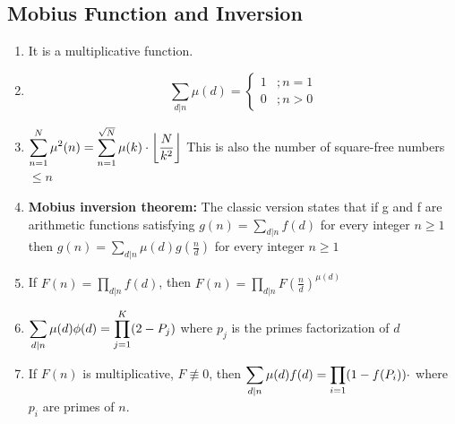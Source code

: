 \subsection{Mobius Function and Inversion}
\begin{enumerate}[resume]
    \item It is a multiplicative function.
    \item \[\sum_{d|n}\mu(d) =
              \begin{cases}
                  1 & ; n=1   \\
                  0 & ; n > 0
              \end{cases}\]
    \item $\displaystyle \displaystyle \sum\limits_{n=1}^N {\mu}^2(n) = \displaystyle \sum\limits_{n=1}^{\sqrt{N}} \mu(k) \cdot \left \lfloor \dfrac{N}{k^2} \right\rfloor$
          This is also the number of square-free numbers $\displaystyle \le n$
    \item \textbf{Mobius inversion theorem:} The classic version states that if g and f are arithmetic functions satisfying
          $g(n) = \displaystyle \sum_{d|n}f(d) $ for every integer $n \ge 1$ then $g(n) = \displaystyle \sum_{d|n}\mu(d)g\left(\frac{n}{d}\right)$ for every integer $n \ge 1$
    \item If $\displaystyle F(n) = \displaystyle \prod_{d|n} f(d)$, then $\displaystyle F(n) = \displaystyle \prod_{d|n} F\left(\frac{n}{d}\right)^{\mu(d)}$
    \item $\displaystyle \displaystyle \sum_{d|n}\mu(d)\phi(d) = \displaystyle \prod_{j=1}^K (2 - P_j)$
          where $\displaystyle p_j$ is the primes factorization of $d$
    \item If $\displaystyle F(n)$ is multiplicative, $\displaystyle F \not\equiv 0$, then $\displaystyle \displaystyle \sum_{d|n} \mu(d) f(d) = \displaystyle \prod_{i=1} (1 - f(P_i)) \cdot$
          where $\displaystyle p_i$ are primes of $n$.
\end{enumerate}

